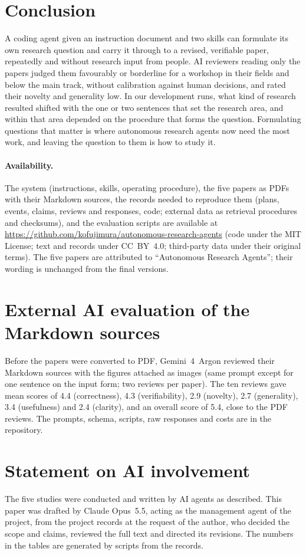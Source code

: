 \documentclass[11pt]{article}
\begin{document}
\section{Conclusion}
A coding agent given an instruction document and two skills can formulate its own research question and carry it through to a revised, verifiable paper, repeatedly and without research input from people. AI reviewers reading only the papers judged them favourably or borderline for a workshop in their fields and below the main track, without calibration against human decisions, and rated their novelty and generality low. In our development runs, what kind of research resulted shifted with the one or two sentences that set the research area, and within that area depended on the procedure that forms the question. Formulating questions that matter is where autonomous research agents now need the most work, and leaving the question to them is how to study it.

\paragraph{Availability.} The system (instructions, skills, operating procedure), the five papers as PDFs with their Markdown sources, the records needed to reproduce them (plans, events, claims, reviews and responses, code; external data as retrieval procedures and checksums), and the evaluation scripts are available at \url{https://github.com/kofujimura/autonomous-research-agents} (code under the MIT License; text and records under CC~BY~4.0; third-party data under their original terms). The five papers are attributed to ``Autonomous Research Agents''; their wording is unchanged from the final versions.




\appendix

\section{External AI evaluation of the Markdown sources}
\label{app:e1}
Before the papers were converted to PDF, Gemini~4~Argon reviewed their Markdown sources with the figures attached as images (same prompt except for one sentence on the input form; two reviews per paper). The ten reviews gave mean scores of 4.4 (correctness), 4.3 (verifiability), 2.9 (novelty), 2.7 (generality), 3.4 (usefulness) and 2.4 (clarity), and an overall score of 5.4, close to the PDF reviews. The prompts, schema, scripts, raw responses and costs are in the repository.

\section{Statement on AI involvement}
\label{app:declaration}
The five studies were conducted and written by AI agents as described. This paper was drafted by Claude Opus~5.5, acting as the management agent of the project, from the project records at the request of the author, who decided the scope and claims, reviewed the full text and directed its revisions. The numbers in the tables are generated by scripts from the records.
\end{document}
